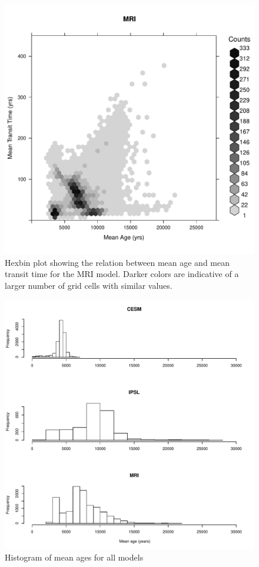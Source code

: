 \documentclass{agujournal}
\begin{document}
\begin{figure}[t]
   \centering
   \includegraphics{Figures/hexbinplot_TTvsA_MRI} %
   \caption{Hexbin plot showing the relation between mean age and mean transit time for the MRI model. Darker colors are indicative of a larger number of grid cells with similar values.}
\end{figure}

\begin{figure}[t]
   \centering
   \includegraphics{Figures/corrSAESMs} %
   \caption{Histogram of mean ages for all models}
\end{figure}
\end{document}
